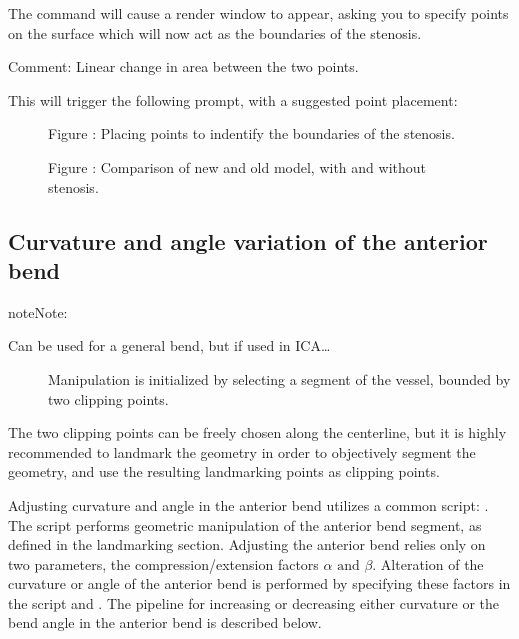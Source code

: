 \documentclass[letterpaper,10pt,english]{sphinxmanual}
\begin{document}
The command will cause a render window to appear, asking you to specify points on the surface which will now act as the boundaries of the stenosis.

Comment: Linear change in area between the two points.

This will trigger the following prompt, with a suggested point placement:

\begin{figure}[htbp]
\centering
\capstart

\noindent{}
\caption{Figure : Placing points to indentify the boundaries of the stenosis.}\label{\detokenize{getting_started:id11}}\end{figure}

\begin{figure}[htbp]
\centering
\capstart

\noindent{}
\caption{Figure : Comparison of new and old model, with and without stenosis.}\label{\detokenize{getting_started:id12}}\end{figure}


\subsection{Curvature and angle variation of the anterior bend}
\label{\detokenize{getting_started:curvature-and-angle-variation-of-the-anterior-bend}}
\begin{sphinxadmonition}{note}{Note:}\begin{description}
\item[{Can be used for a general bend, but if used in ICA…}] \leavevmode
Manipulation is initialized by selecting a segment of the vessel, bounded by two clipping points.

\end{description}

The two clipping points can be freely chosen along the centerline, but it is highly recommended to landmark the geometry in order to objectively segment the geometry, and use the resulting landmarking points as clipping points.
\end{sphinxadmonition}

Adjusting curvature and angle in the anterior bend utilizes a common script: . The script performs geometric manipulation of the anterior bend segment, as defined in the landmarking section.
Adjusting the anterior bend relies only on two parameters, the compression/extension factors \(\alpha \text{ and } \beta\).
Alteration of the curvature or angle of the anterior bend is performed by specifying these factors in the script   and .
The pipeline for increasing or decreasing either curvature or the bend angle in the anterior bend is described below.
\end{document}
